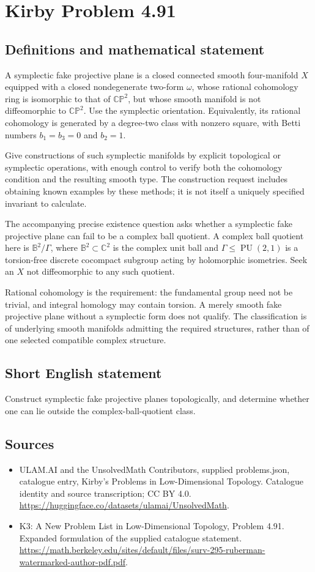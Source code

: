 \documentclass[11pt,a4paper]{article}
\begin{document}
\section*{Kirby Problem 4.91}\label{statement}

\subsection{Definitions and mathematical statement}
A symplectic fake projective plane is a closed connected smooth four-manifold $X$ equipped with a closed nondegenerate two-form $\omega$, whose rational cohomology ring is isomorphic to that of $\mathbb{CP}^2$, but whose smooth manifold is not diffeomorphic to $\mathbb{CP}^2$. Use the symplectic orientation. Equivalently, its rational cohomology is generated by a degree-two class with nonzero square, with Betti numbers $b_1=b_3=0$ and $b_2=1$.

Give constructions of such symplectic manifolds by explicit topological or symplectic operations, with enough control to verify both the cohomology condition and the resulting smooth type. The construction request includes obtaining known examples by these methods; it is not itself a uniquely specified invariant to calculate.

The accompanying precise existence question asks whether a symplectic fake projective plane can fail to be a complex ball quotient. A complex ball quotient here is $\mathbb B^2/\Gamma$, where $\mathbb B^2\subset\mathbb C^2$ is the complex unit ball and $\Gamma\le\operatorname{PU}(2,1)$ is a torsion-free discrete cocompact subgroup acting by holomorphic isometries. Seek an $X$ not diffeomorphic to any such quotient.

Rational cohomology is the requirement: the fundamental group need not be trivial, and integral homology may contain torsion. A merely smooth fake projective plane without a symplectic form does not qualify. The classification is of underlying smooth manifolds admitting the required structures, rather than of one selected compatible complex structure.
\subsection{Short English statement}
Construct symplectic fake projective planes topologically, and determine whether one can lie outside the complex-ball-quotient class.
\subsection{Sources}
\begin{itemize}
\item[S1] ULAM.AI and the UnsolvedMath Contributors, supplied problems.json, catalogue entry, Kirby's Problems in Low-Dimensional Topology. Catalogue identity and source transcription; CC BY 4.0.
\url{https://huggingface.co/datasets/ulamai/UnsolvedMath}.
\item[S2] K3: A New Problem List in Low-Dimensional Topology, Problem 4.91. Expanded formulation of the supplied catalogue statement.
\url{https://math.berkeley.edu/sites/default/files/surv-295-ruberman-watermarked-author-pdf.pdf}.
\end{itemize}
\end{document}
